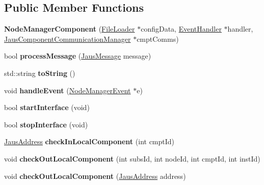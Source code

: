 \subsection*{\-Public \-Member \-Functions}
\begin{DoxyCompactItemize}
\item 
\hypertarget{class_node_manager_component_a1132ae97087885540a8ce0155d36ca9d}{{\bfseries \-Node\-Manager\-Component} (\hyperlink{class_file_loader}{\-File\-Loader} $\ast$config\-Data, \hyperlink{class_event_handler}{\-Event\-Handler} $\ast$handler, \hyperlink{class_jaus_component_communication_manager}{\-Jaus\-Component\-Communication\-Manager} $\ast$cmpt\-Comms)}\label{class_node_manager_component_a1132ae97087885540a8ce0155d36ca9d}

\item 
\hypertarget{class_node_manager_component_a916d5c4c2c1ccb5ed618fb2e10ad4fb8}{bool {\bfseries process\-Message} (\hyperlink{struct_jaus_message_struct}{\-Jaus\-Message} message)}\label{class_node_manager_component_a916d5c4c2c1ccb5ed618fb2e10ad4fb8}

\item 
\hypertarget{class_node_manager_component_a0002875c9cefb6c8df55840d7957e8db}{std\-::string {\bfseries to\-String} ()}\label{class_node_manager_component_a0002875c9cefb6c8df55840d7957e8db}

\item 
\hypertarget{class_node_manager_component_a30c3226f6c29bad3fd8cad48e49045aa}{void {\bfseries handle\-Event} (\hyperlink{class_node_manager_event}{\-Node\-Manager\-Event} $\ast$e)}\label{class_node_manager_component_a30c3226f6c29bad3fd8cad48e49045aa}

\item 
\hypertarget{class_node_manager_component_a0ca15f4d338f7a00982a0b0808969ab4}{bool {\bfseries start\-Interface} (void)}\label{class_node_manager_component_a0ca15f4d338f7a00982a0b0808969ab4}

\item 
\hypertarget{class_node_manager_component_ac1d77cb2f85382256954ae7a21adf588}{bool {\bfseries stop\-Interface} (void)}\label{class_node_manager_component_ac1d77cb2f85382256954ae7a21adf588}

\item 
\hypertarget{class_node_manager_component_a1b0c153f0963c072902f9e2ea637cd2b}{\hyperlink{struct_jaus_address_struct}{\-Jaus\-Address} {\bfseries check\-In\-Local\-Component} (int cmpt\-Id)}\label{class_node_manager_component_a1b0c153f0963c072902f9e2ea637cd2b}

\item 
\hypertarget{class_node_manager_component_a308666330759113934cc0b13b5cb3779}{void {\bfseries check\-Out\-Local\-Component} (int subs\-Id, int node\-Id, int cmpt\-Id, int inst\-Id)}\label{class_node_manager_component_a308666330759113934cc0b13b5cb3779}

\item 
\hypertarget{class_node_manager_component_a9145b910e95e758172f469e761814b8c}{void {\bfseries check\-Out\-Local\-Component} (\hyperlink{struct_jaus_address_struct}{\-Jaus\-Address} address)}\label{class_node_manager_component_a9145b910e95e758172f469e761814b8c}

\end{DoxyCompactItemize}
